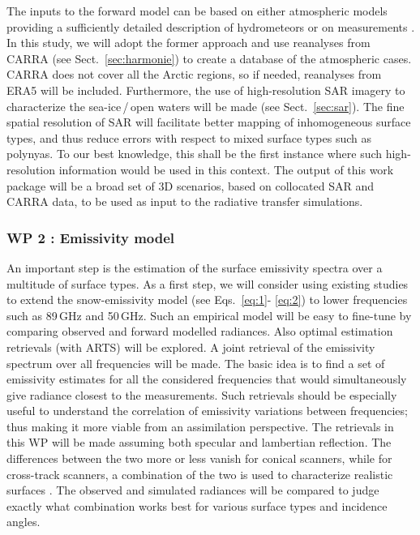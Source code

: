 \documentclass[12pt,oneside,a4paper]{article}
\begin{document}
\label{sec:atmscenes}
The inputs to the forward model can be based on either atmospheric models
providing a sufficiently detailed description of hydrometeors or on
measurements \citep{ekelund:using:20}. In this study, we will adopt the former
approach and use reanalyses from CARRA (see Sect.~\ref{sec:harmonie}) to create
a database of the atmospheric cases. CARRA does not cover all the Arctic
regions, so if needed, reanalyses from ERA5 will be included. Furthermore, the use
of high-resolution SAR imagery to characterize the sea-ice\,/\,open waters will be
made (see Sect.~\ref{sec:sar}). The fine spatial resolution of SAR will
facilitate better mapping of inhomogeneous surface types, and thus reduce
errors with respect to mixed surface types such as polynyas. To our best
knowledge, this shall be the first instance where such high-resolution
information would be used in this context. The output of this work package will
be a broad set of 3D scenarios, based on collocated SAR and CARRA data, to be
used as input to the radiative transfer simulations. \vspace{-1.0ex}

\subsubsection*{WP 2 : Emissivity model}
%
\label{sec:emissivity}
An important step is the estimation of the surface emissivity spectra over a
multitude of surface types. As a first step, we will consider using existing
studies to extend the snow-emissivity model (see Eqs.~\ref{eq:1}- \ref{eq:2})
to lower frequencies such as 89\,GHz and 50\,GHz. Such an empirical model will
be easy to fine-tune by comparing observed and forward modelled radiances. Also
optimal estimation retrievals (with ARTS) will be explored. A joint retrieval
of the emissivity spectrum over all frequencies will be made. The basic idea is
to find a set of emissivity estimates for all the considered frequencies that
would simultaneously give radiance closest to the measurements. Such retrievals
should be especially useful to understand the correlation of emissivity
variations between frequencies; thus making it more viable from an assimilation
perspective. The retrievals in this WP will be made assuming both specular and
lambertian reflection. The differences between the two more or less vanish for
conical scanners, while for cross-track scanners, a combination of the two is
used to characterize realistic surfaces \citep{matzler:2005:onthe}. The
observed and simulated radiances will be compared to judge exactly what
combination works best for various surface types and incidence angles.
\end{document}
